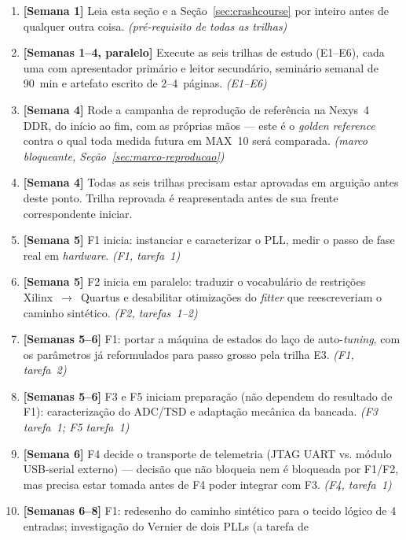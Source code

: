 \documentclass[11pt,a4paper]{article}
\begin{document}
\begin{enumerate}[leftmargin=2.4em]
  \item \textbf{[Semana 1]} Leia esta seção e a Seção~\ref{sec:crashcourse} por
        inteiro antes de qualquer outra coisa. \emph{(pré-requisito de todas as
        trilhas)}
  \item \textbf{[Semanas 1--4, paralelo]} Execute as seis trilhas de estudo
        (E1--E6), cada uma com apresentador primário e leitor secundário, seminário
        semanal de 90~min e artefato escrito de 2--4~páginas. \emph{(E1--E6)}
  \item \textbf{[Semana 4]} Rode a campanha de reprodução de referência na Nexys~4
        DDR, do início ao fim, com as próprias mãos --- este é o \emph{golden
        reference} contra o qual toda medida futura em MAX~10 será comparada.
        \emph{(marco bloqueante, Seção~\ref{sec:marco-reproducao})}
  \item \textbf{[Semana 4]} Todas as seis trilhas precisam estar aprovadas em
        arguição antes deste ponto. Trilha reprovada é reapresentada antes de sua
        frente correspondente iniciar.
  \item \textbf{[Semana 5]} F1 inicia: instanciar e caracterizar o PLL, medir o
        passo de fase real em \emph{hardware}. \emph{(F1, tarefa~1)}
  \item \textbf{[Semana 5]} F2 inicia em paralelo: traduzir o vocabulário de
        restrições Xilinx~$\rightarrow$~Quartus e desabilitar otimizações do
        \emph{fitter} que reescreveriam o caminho sintético. \emph{(F2, tarefas~1--2)}
  \item \textbf{[Semanas 5--6]} F1: portar a máquina de estados do laço de
        auto-\emph{tuning}, com os parâmetros já reformulados para passo grosso pela
        trilha E3. \emph{(F1, tarefa~2)}
  \item \textbf{[Semanas 5--6]} F3 e F5 iniciam preparação (não dependem do
        resultado de F1): caracterização do ADC/TSD e adaptação mecânica da bancada.
        \emph{(F3 tarefa~1; F5 tarefa~1)}
  \item \textbf{[Semana 6]} F4 decide o transporte de telemetria (JTAG UART vs.
        módulo USB-serial externo) --- decisão que não bloqueia nem é bloqueada por
        F1/F2, mas precisa estar tomada antes de F4 poder integrar com F3.
        \emph{(F4, tarefa~1)}
  \item \textbf{[Semanas 6--8]} F1: redesenho do caminho sintético para o tecido
        lógico de 4 entradas; investigação do Vernier de dois PLLs (a tarefa de

\end{enumerate}
\end{document}
